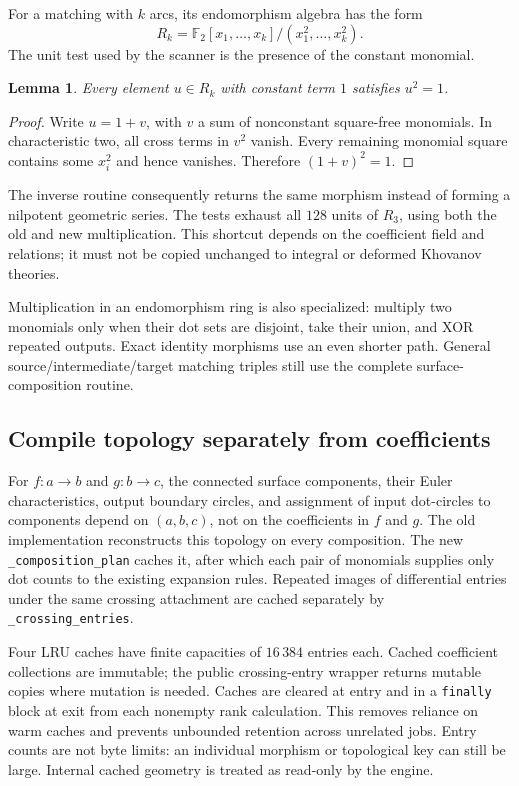 \documentclass[11pt]{article}
\newtheorem{lemma}[theorem]{Lemma}
\theoremstyle{remark}\newtheorem{remark}[theorem]{Remark}
\newcommand{\F}{\mathbb F}
\newcommand{\code}[1]{\texttt{\small #1}}
\begin{document}
For a matching with $k$ arcs, its endomorphism algebra has the form
\[
 R_k=\F_2[x_1,\ldots,x_k]/(x_1^2,\ldots,x_k^2).
\]
The unit test used by the scanner is the presence of the constant monomial.

\begin{lemma}\label{lem:unit}
Every element $u\in R_k$ with constant term $1$ satisfies $u^2=1$.
\end{lemma}
\begin{proof}
Write $u=1+v$, with $v$ a sum of nonconstant square-free monomials.
In characteristic two, all cross terms in $v^2$ vanish. Every remaining
monomial square contains some $x_i^2$ and hence vanishes. Therefore
$(1+v)^2=1$.
\end{proof}

The inverse routine consequently returns the same morphism instead of
forming a nilpotent geometric series. The tests exhaust all $128$ units
of $R_3$, using both the old and new multiplication. This shortcut depends
on the coefficient field and relations; it must not be copied unchanged
to integral or deformed Khovanov theories.

Multiplication in an endomorphism ring is also specialized: multiply two
monomials only when their dot sets are disjoint, take their union, and
XOR repeated outputs. Exact identity morphisms use an even shorter path.
General source/intermediate/target matching triples still use the complete
surface-composition routine.

\subsection{Compile topology separately from coefficients}

For $f:a\to b$ and $g:b\to c$, the connected surface components, their
Euler characteristics, output boundary circles, and assignment of input
dot-circles to components depend on $(a,b,c)$, not on the coefficients in
$f$ and $g$. The old implementation reconstructs this topology on every
composition. The new \code{\_composition\_plan} caches it, after which each
pair of monomials supplies only dot counts to the existing expansion rules.
Repeated images of differential entries under the same crossing attachment
are cached separately by \code{\_crossing\_entries}.

Four LRU caches have finite capacities of $16\,384$ entries each. Cached
coefficient collections are immutable; the public crossing-entry wrapper
returns mutable copies where mutation is needed. Caches are cleared at
entry and in a \code{finally} block at exit from each nonempty rank
calculation. This removes reliance on warm caches and prevents unbounded
retention across unrelated jobs. Entry counts are not byte limits: an
individual morphism or topological key can still be large. Internal cached
geometry is treated as read-only by the engine.
\end{document}
